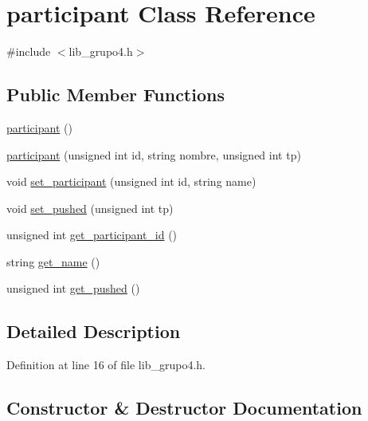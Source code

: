 \hypertarget{classparticipant}{}\section{participant Class Reference}
\label{classparticipant}


{\ttfamily \#include $<$lib\+\_\+grupo4.\+h$>$}

\subsection*{Public Member Functions}
\begin{DoxyCompactItemize}
\item 
\hyperlink{classparticipant_aed68ba6ec61d7b46f777f4853d645dd9}{participant} ()
\item 
\hyperlink{classparticipant_aa051b5d45d53d1ab5ac417006c90c76e}{participant} (unsigned int id, string nombre, unsigned int tp)
\item 
void \hyperlink{classparticipant_ac6d9797d61b16b3ccc2edf65ed73ff65}{set\+\_\+participant} (unsigned int id, string name)
\item 
void \hyperlink{classparticipant_a8633b78a8492889f04cf05d3b892939f}{set\+\_\+pushed} (unsigned int tp)
\item 
unsigned int \hyperlink{classparticipant_aa43dcd507d0497ed4609298da5a5d70f}{get\+\_\+participant\+\_\+id} ()
\item 
string \hyperlink{classparticipant_ab48b986f5c085ffff4bf71d2cd3778e9}{get\+\_\+name} ()
\item 
unsigned int \hyperlink{classparticipant_ab72b1560eaa178c674bf13bbb6e17206}{get\+\_\+pushed} ()
\end{DoxyCompactItemize}


\subsection{Detailed Description}


Definition at line 16 of file lib\+\_\+grupo4.\+h.



\subsection{Constructor \& Destructor Documentation}
\mbox{\label{classparticipant_aed68ba6ec61d7b46f777f4853d645dd9}} 
